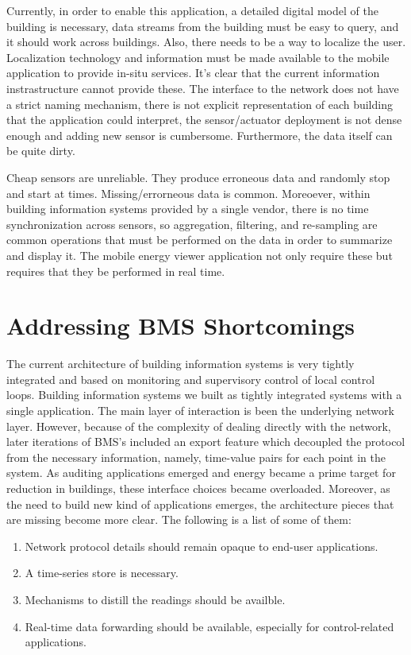 Currently, in order to enable this application, a detailed digital model of the building is necessary, data streams from the building must
be easy to query, and it should work across buildings.  Also, there needs to be a way to localize the user. 
Localization technology and information must be made available to the mobile application to provide in-situ services.
It's clear that the current information instrastructure cannot provide these.  The interface to the network does not have
a strict naming mechanism, there is not explicit representation of each building that the application could interpret, 
the sensor/actuator deployment is not dense enough and adding new sensor is cumbersome.  Furthermore, the data itself can be quite dirty.

Cheap sensors are unreliable.  They produce erroneous data and randomly stop and start at times.  Missing/errorneous data is common.
Moreoever, within building information systems provided by a single vendor, there is no time synchronization across sensors, so
aggregation, filtering, and re-sampling are common operations that must be performed on the data in order to summarize and display it.
The mobile energy viewer application not only require these but requires that they be performed in real time.


\section{Addressing BMS Shortcomings}
The current architecture of building information systems is very tightly integrated and based on monitoring and supervisory control
of local control loops.  Building information systems we built as tightly integrated systems with a single application.  The main
layer of interaction is been the underlying network layer.  However, because of the complexity of dealing directly with the network,
later iterations of BMS's included an export feature which decoupled the protocol from the necessary information, namely, time-value
pairs for each point in the system.  As auditing applications emerged and energy became a prime target for reduction in buildings, 
these interface choices became overloaded.  Moreover, as the need to build new kind of applications emerges, the architecture pieces
that are missing become more clear.  The following is a list of some of them:

\begin{enumerate}
\item Network protocol details should remain opaque to end-user applications.
\item A time-series store is necessary.
\item Mechanisms to distill the readings should be availble.
\item Real-time data forwarding should be available, especially for control-related applications.
\end{enumerate}

